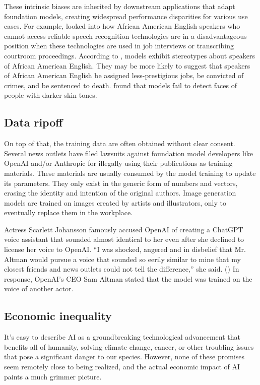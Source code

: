 \documentclass[12pt]{article}
\begin{document}
These intrinsic biases are inherited by downstream applications that adapt foundation models, creating widespread performance disparities for various use cases. For example, \cite{doi:10.1073/pnas.1915768117} looked into how African American English speakers who cannot access reliable speech recognition technologies are in a disadvantageous position when these technologies are used in job interviews or transcribing courtroom proceedings. According to \cite{Hofmann2024}, models exhibit stereotypes about speakers of African American English. They may be more likely to suggest that speakers of African American English be assigned less-prestigious jobs, be convicted of crimes, and be sentenced to death. \cite{10.1145/3442188.3445928} found that models fail to detect faces of people with darker skin tones.

\subsection{Data ripoff}
On top of that, the training data are often obtained without clear consent. Several news outlets have filed lawsuits against foundation model developers like OpenAI and/or Anthropic for illegally using their publications as training materials. These materials are usually consumed by the model training to update its parameters. They only exist in the generic form of numbers and vectors, erasing the identity and intention of the original authors. Image generation models are trained on images created by artists and illustrators, only to eventually replace them in the workplace.

Actress Scarlett Johansson famously accused OpenAI of creating a ChatGPT voice assistant that sounded almost identical to her even after she declined to license her voice to OpenAI. ``I was shocked, angered and in disbelief that Mr. Altman would pursue a voice that sounded so eerily similar to mine that my closest friends and news outlets could not tell the difference,'' she said. (\cite{scarlett}) In response, OpenAI's CEO Sam Altman stated that the model was trained on the voice of another actor.

\subsection{Economic inequality}\label{econ}
It's easy to describe AI as a groundbreaking technological advancement that benefits all of humanity, solving climate change, cancer, or other troubling issues that pose a significant danger to our species. However, none of these promises seem remotely close to being realized, and the actual economic impact of AI paints a much grimmer picture.
\end{document}

